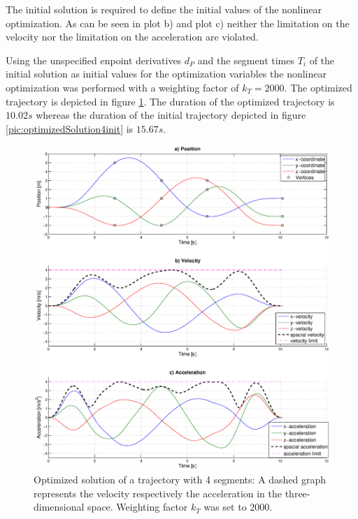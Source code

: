 The initial solution is required to define the initial values of the nonlinear optimization.
As can be seen in plot b) and plot c) neither the limitation on the velocity nor the limitation on the acceleration are violated.



Using the unspecified enpoint derivatives $d_P$ and the segment times $T_i$ of the initial solution as initial values for the optimization variables the nonlinear optimization was performed with a weighting factor of $k_T = 2000$. The optimized trajectory is depicted in figure \ref{pic:optimizedSolution4optik2000}. The duration of the optimized trajectory is $10.02s$ whereas the duration of the initial trajectory depicted in figure \ref{pic:optimizedSolution4init} is $15.67s$.


\begin{figure}[H]
   \centering
   \includegraphics[trim = 35mm 30mm 30mm 15mm,clip,width=1\textwidth]{pics/4SegOpti10s01k2000.eps}
   \caption{Optimized solution of a trajectory with 4 segments: A dashed graph represents the velocity respectively the acceleration in the three-dimensional space. Weighting factor $k_T$ was set to 2000.}
   \label{pic:optimizedSolution4optik2000} 
\end{figure}

